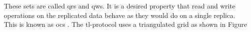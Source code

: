 These sets are called \glspl{qr} and \glspl{qw}.
It is a desired property that read and write operations on the replicated data
behave as they would do on a single replica. 
This is known as \gls{ocs} \cite{BHG87:ccr}.
The \gls{tl}-protocol uses a triangulated grid as shown in Figure
